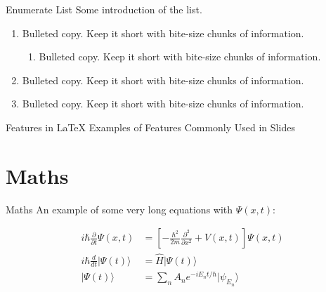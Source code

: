 \documentclass{loyola-beamer}
\begin{document}
\begin{frame}{Enumerate List}
    Some introduction of the list.
    \begin{enumerate}
        \item Bulleted copy. Keep it short with bite-size chunks of information.
        \begin{enumerate}
            \item Bulleted copy. Keep it short with bite-size chunks of information.
        \end{enumerate}
        \item Bulleted copy. Keep it short with bite-size chunks of information.
        \item Bulleted copy. Keep it short with bite-size chunks of information.
    \end{enumerate}
\end{frame}

\begin{titleframe}{Features in \LaTeX}
    Examples of Features Commonly Used in Slides
\end{titleframe}

\section{Maths}

\begin{frame}{Maths}
    An example of some very long equations with $\Psi (x,t)$:
    
    \begin{align}
    i\hbar {\frac {\partial }{\partial t}}\Psi (x,t)&=\left[-{\frac {\hbar ^{2}}{2m}}{\frac {\partial ^{2}}{\partial x^{2}}}+V(x,t)\right]\Psi (x,t) \\
    i\hbar {\frac {d}{dt}}\vert \Psi (t)\rangle &={\hat {H}}\vert \Psi (t)\rangle \\ 
    |\Psi (t)\rangle &=\sum _{n}A_{n}e^{{-iE_{n}t}/\hbar }|\psi _{E_{n}}\rangle
    \end{align}

\end{frame}
\end{document}
